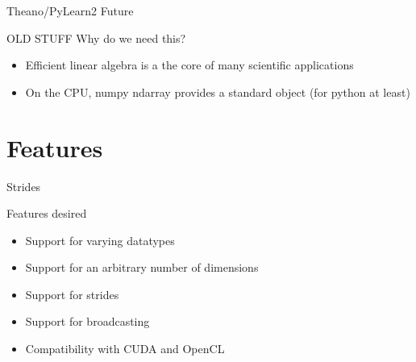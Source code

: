 \documentclass[utf8x,xcolor=pdftex,dvipsnames,table]{beamer}
\begin{document}
\begin{frame}{Theano/PyLearn2 Future}
\end{frame}

\begin{frame}{OLD STUFF Why do we need this?}
\begin{itemize}
\item Efficient linear algebra is a the core of many scientific applications
\item On the CPU, numpy ndarray provides a standard object (for python at least)
\end{itemize}
\end{frame}

\section{Features}

\begin{frame}{Strides}
\begin{center}
\hspace{5em}
\end{center}
\begin{center}
\end{center}
\end{frame}

\begin{frame}{Features desired}
\begin{itemize}
\item {\color{gray!80} Support for varying datatypes}
\item {\color{gray!80} Support for an arbitrary number of dimensions}
\item {\color{gray!80} Support for strides}
\item Support for broadcasting
\item {\color{gray!80} Compatibility with CUDA and OpenCL}
\end{itemize}
\end{frame}
\end{document}
